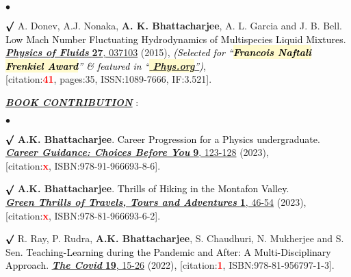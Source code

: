 \documentclass[margin,line]{res}
\newenvironment{list1}{
  \begin{list}{\ding{113}}{%
      \setlength{\itemsep}{0in}
      \setlength{\parsep}{0in} \setlength{\parskip}{0in}
      \setlength{\topsep}{0in} \setlength{\partopsep}{0in} 
      \setlength{\leftmargin}{0.17in}}}{\end{list}}
\newenvironment{list2}{
  \begin{list}{$\bullet$}{%
      \setlength{\itemsep}{0in}
      \setlength{\parsep}{0in} \setlength{\parskip}{0in}
      \setlength{\topsep}{0in} \setlength{\partopsep}{0in} 
      \setlength{\leftmargin}{0.2in}}}{\end{list}}
\begin{document}
\begin{resume}
\begin{list2}
\item[$\pmb\surd$] A. Donev, A.J. Nonaka, {\bf A. K. Bhattacharjee}, A. L. Garcia and J. B. Bell. \textcolor{black}{\textsf{Low Mach Number 
Fluctuating Hydrodynamics of Multispecies Liquid Mixtures}}. \href{http://scitation.aip.org/content/aip/journal/pof2/27/3/10.1063/1.4913571}{\underline{\textit{\textbf{Physics of Fluids}}} {\bf 27}, 037103} (2015), \textcolor{black}{\small \it(Selected for ``\colorbox{lemonchiffon}{\bf Francois Naftali 
Frenkiel Award}'' \& featured in ``\href{http://phys.org/news/2015-03-mathematicians-fluids-mesoscale.html}{\colorbox{lemonchiffon}{\bf 
Phys.org}''})}, \\{[citation:\textcolor{red}{\bf 41}, pages:35, ISSN:1089-7666, IF:3.521]}.
\end{list2}
\vspace{4mm}
\begin{list1}
\item[] \textcolor{alizarin}{\ul{\textbf{\textit{BOOK CONTRIBUTION}}} :}
\end{list1}
\vspace{2mm}
\begin{list2}
\item[$\pmb\surd$] {\bf A.K. Bhattacharjee}. \textcolor{black}{\textsf{Career Progression for a Physics undergraduate}}. 
\\ \href{https://asutoshcollege.in/new-web/images/gallery/CCTP/02.jpg}{\underline{\textit{\textbf{Career Guidance: Choices Before You}}} {\bf 9}, 123-128} (2023), \\ {[citation:\textcolor{red}{\bf x}, ISBN:978-91-966693-8-6]}.
\vspace{2mm}
\item[$\pmb\surd$] {\bf A.K. Bhattacharjee}. \textcolor{black}{\textsf{Thrills of Hiking in the Montafon Valley}}. \\ 
\href{https://amitbny.github.io/akb.github.io/doc/GreenThrills_AKB.pdf}{\underline{\textit{\textbf{Green Thrills of Travels, Tours and Adventures}}} {\bf 1}, 46-54} (2023), \\{[citation:\textcolor{red}{\bf x}, ISBN:978-81-966693-6-2]}.
\vspace{2mm}
\item[$\pmb\surd$] R. Ray, P. Rudra, {\bf A.K. Bhattacharjee}, S. Chaudhuri, N. Mukherjee and S. Sen. \textcolor{black}{\textsf{
Teaching-Learning during the Pandemic and After: A Multi-Disciplinary Approach}}. \href{https://papers.ssrn.com/sol3/papers.cfm?abstract_id=4082658}{\underline{\textit{\textbf{The Covid}}} {\bf 19}, 15-26} (2022), {[citation:\textcolor{red}{\bf 1}, ISBN:978-81-956797-1-3]}.
\end{list2}


\end{resume}
\end{document}
